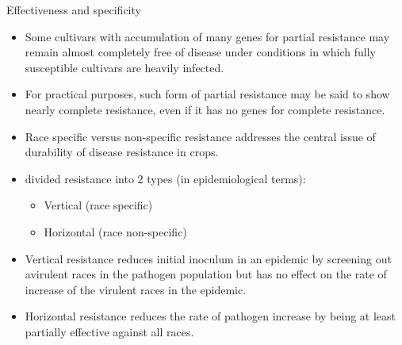 \documentclass[11pt,dvipsnames,ignorenonframetext,aspectratio=169]{beamer}
\providecommand{\tightlist}{%
  \setlength{\itemsep}{0pt}\setlength{\parskip}{0pt}}
\begin{document}
\begin{frame}{Effectiveness and specificity}
\protect\hypertarget{effectiveness-and-specificity}{}
\small

\begin{itemize}
\tightlist
\item
  Some cultivars with accumulation of many genes for partial resistance
  may remain almost completely free of disease under conditions in which
  fully susceptible cultivars are heavily infected.
\item
  For practical purposes, such form of partial resistance may be said to
  show nearly complete resistance, even if it has no genes for complete
  resistance.
\item
  Race specific versus non-specific resistance addresses the central
  issue of durability of disease resistance in crops.
\item
  \citet{vanderplank2012disease} divided resistance into 2 types (in
  epidemiological terms):

  \begin{itemize}
  \tightlist
  \item
    Vertical (race specific)
  \item
    Horizontal (race non-specific)
  \end{itemize}
\item
  Vertical resistance reduces initial inoculum in an epidemic by
  screening out avirulent races in the pathogen population but has no
  effect on the rate of increase of the virulent races in the epidemic.
\item
  Horizontal resistance reduces the rate of pathogen increase by being
  at least partially effective against all races.
\end{itemize}
\end{frame}
\end{document}
